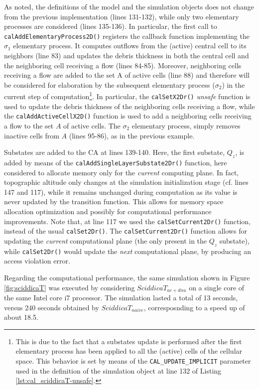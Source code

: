 As noted, the definitions of the model and the simulation objects does
not change from the previous implementation (lines 131-132), while
only two elementary processes are considered (lines 135-136). In
particular, the first call to \verb'calAddElementaryProcess2D()'
registers the callback function implementing the $\sigma_1$ elementary
process. It computes outflows from the (active) central cell to its
neighbors (line 83) and updates the debris thickness in both the
central cell and the neighboring cell receiving a flow (lines
84-85). Moreover, neighboring cells receiving a flow are added to the
set A of active cells (line 88) and therefore will be considered for
elaboration by the subsequent elementary process ($\sigma_2$) in the
current step of computation\footnote{This is due to the fact that a
  substates update is performed after the first elementary process has
  been applied to all the (active) cells of the cellular space. This
  behavior is set by means of the \texttt{CAL\_UPDATE\_IMPLICIT}
  parameter used in the definition of the simulation object at line
  132 of Listing \ref{lst:cal_sciddicaT-unsafe}.}. In particular, the
\verb'calSetX2Dr()' \emph{unsafe} function is used to update the
debris thickness of the neighboring cells receiving a flow, while the
\verb'calAddActiveCellX2D()' function is used to add a neighboring
cells receiving a flow to the set $A$ of active cells.  The $\sigma_2$
elementary process, simply removes inactive cells from $A$ (lines
95-86), as in the previous example.


Substates are added to the CA at lines 139-140. Here, the first
substate, $Q_z$, is added by means of the
\verb'calAddSingleLayerSubstate2Dr()' function, here considered
to allocate memory only for the \emph{current} computing plane. In
fact, topographic altitude only changes at the simulation
initialization stage (cf. lines 147 and 117), while it remains
unchanged during computation as its value is never updated by the
transition function. This allows for memory space allocation
optimization and possibly for computational performance
improvements. Note that, at line 117 we used the
\verb'calSetCurrent2Dr()' function, instead of the usual
\verb'calSet2Dr()'. The \verb'calSetCurrent2Dr()' function allows for
updating the \emph{current} computational plane (the only present in
the $Q_z$ substate), while \verb'calSet2Dr()' would update the
\emph{next} computational plane, by producing an access violation
error.

Regarding the computational performance, the same simulation shown in
Figure \ref{fig:sciddicaT} was executed by considering
$SciddicaT_{ac+dnu}$ on a single core of the same Intel core i7
processor. The simulation lasted a total of 13 seconds, versus 240
seconds obtained by $SciddicaT_{naive}$, corresposnding to a speed up
of about 18.5.

